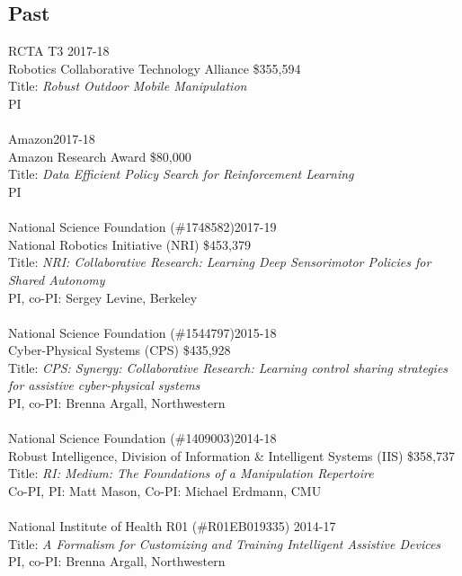 \subsection{Past}
\noindent
RCTA T3 \hfill 2017-18\\
Robotics Collaborative Technology Alliance \hfill \$355,594\\
Title: \textit{Robust Outdoor Mobile Manipulation}\\
PI\\
\\
Amazon\hfill 2017-18\\
Amazon Research Award \hfill \$80,000\\
Title: \textit{Data Efficient Policy Search for Reinforcement Learning}\\
PI\\
\\
National Science Foundation (\#1748582)\hfill 2017-19\\
National Robotics Initiative (NRI) \hfill \$453,379\\
Title: \textit{NRI: Collaborative Research: Learning Deep Sensorimotor Policies for Shared Autonomy}\\
PI, co-PI: Sergey Levine, Berkeley\\
\\
National Science Foundation (\#1544797)\hfill 2015-18\\
Cyber-Physical Systems (CPS) \hfill \$435,928\\
Title: \textit{CPS: Synergy: Collaborative Research: Learning control sharing strategies for assistive cyber-physical systems}\\
PI, co-PI: Brenna Argall, Northwestern\\
\\
National Science Foundation (\#1409003)\hfill 2014-18\\
Robust Intelligence, Division of Information \& Intelligent Systems (IIS) \hfill \$358,737\\
Title: \textit{RI: Medium: The Foundations of a Manipulation Repertoire}\\
Co-PI, PI: Matt Mason, Co-PI: Michael Erdmann, CMU\\
\\
National Institute of Health R01 (\#R01EB019335) \hfill 2014-17\\
Title: \textit{A Formalism for Customizing and Training Intelligent Assistive Devices}\\
PI, co-PI: Brenna Argall, Northwestern\\
